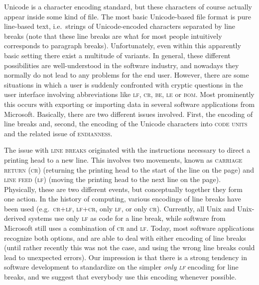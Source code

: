 Unicode is a character encoding standard, but these characters of course
actually appear inside some kind of file. The most basic Unicode-based file
format is pure line-based text, i.e.~strings of Unicode-encoded characters
separated by line breaks (note that these line breaks are what for most people
intuitively corresponds to paragraph breaks). Unfortunately, even within this
apparently basic setting there exist a multitude of variants. In general, these
different possibilities are well-understood in the software industry, and
nowadays they normally do not lead to any problems for the end user. However,
there are some situations in which a user is suddenly confronted with cryptic
questions in the user interface involving abbreviations like \textsc{lf},
\textsc{cr}, \textsc{be}, \textsc{le} or \textsc{bom}. Most prominently this
occurs with exporting or importing data in several software applications from
Microsoft. Basically, there are two different issues involved. First, the
encoding of line breaks and, second, the encoding of the Unicode characters into
\textsc{code units} and the related issue of \textsc{endianness}.

The issue with \textsc{line breaks} originated with the instructions necessary
to direct a printing head to a new line. This involves two movements, known as
\textsc{carriage return (cr)} (returning the printing head to the start of the
line on the page) and \textsc{line feed (lf)} (moving the printing head to the
next line on the page). Physically, these are two different events, but
conceptually together they form one action. In the history of computing, various
encodings of line breaks have been used (e.g.~\textsc{cr+lf}, \textsc{lf+cr},
only \textsc{lf}, or only \textsc{cr}). Currently, all Unix and Unix-derived
systems use only \textsc{lf} as code for a line break, while software from
Microsoft still uses a combination of \textsc{cr} and \textsc{lf}. Today, most
software applications recognize both options, and are able to deal with either
encoding of line breaks (until rather recently this was not the case, and using
the wrong line breaks could lead to unexpected errors). Our impression is that
there is a strong tendency in software development to standardize on the simpler
\textit{only \textsc{lf}} encoding for line breaks, and we suggest that
everybody use this encoding whenever possible.

